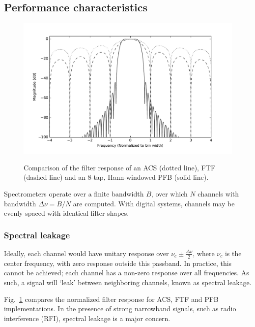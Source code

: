 \documentclass{ws-rv961x669}
\begin{document}
\subsection{Performance characteristics}

\begin{figure}
 \centering
 \includegraphics[width=\textwidth]{./figures/fb_comparison}
 \label{fig:pfb_response}
 \caption{Comparison of the filter response of an ACS (dotted line), FTF (dashed line) and an 8-tap, Hann-windowed PFB (solid line).\label{fig:leakage}}
\end{figure}

Spectrometers operate over a finite bandwidth $B$, over which $N$ channels with bandwidth $\Delta\nu = B/N$ are computed.  With digital systems, channels may be evenly spaced with identical filter shapes. 

\subsubsection{Spectral leakage}

Ideally, each channel would have unitary response over $\nu_c \pm \frac{\Delta\nu}{2}$, where $\nu_c$ is the center frequency, with zero response outside this passband. In practice, this cannot be achieved; each channel has a non-zero response over all frequencies.  As such, a signal will `leak' between neighboring channels, known as spectral leakage.

Fig.~\ref{fig:leakage} compares the normalized filter response for ACS, FTF and PFB implementations. In the presence of strong narrowband signals, such as radio interference (RFI), spectral leakage is a major concern.
\end{document}
